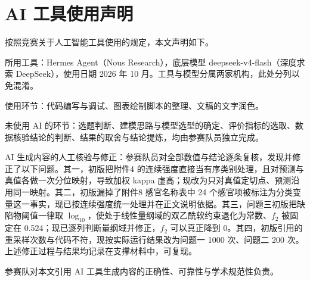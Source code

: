 \section*{AI 工具使用声明}

按照竞赛关于人工智能工具使用的规定，本文声明如下。

所用工具：Hermes Agent（Nous Research），底层模型 deepseek-v4-flash（深度求索 DeepSeek），使用日期 2026 年 10 月\cite{deepseek}。工具与模型分属两家机构，此处分列以免混淆。

使用环节：代码编写与调试、图表绘制脚本的整理、文稿的文字润色。

未使用 AI 的环节：选题判断、建模思路与模型选型的确定、评价指标的选取、数据核验结论的判断、结果的取舍与结论提炼，均由参赛队员独立完成。

AI 生成内容的人工核验与修正：参赛队员对全部数值与结论逐条复核，发现并修正了以下问题。其一，初版把附件4 的连续强度直接当有序类别处理，且对预测与真值各做一次分位映射，导致加权 kappa 虚高；现改为只对真值定切点、预测沿用同一映射。其二，初版漏掉了附件8 感官名称表中 24 个感官项被标注为分类变量这一事实，现已按连续强度统一处理并在正文说明依据。其三，问题三初版把缺陷物阈值一律取 $\log_{10}$，使处于线性量纲域的双乙酰软约束退化为常数、$f_2$ 被固定在 0.524；现已逐列判断量纲域并修正，$f_2$ 可以真正降到 0。其四，初版引用的重采样次数与代码不符，现按实际运行结果改为问题一 1000 次、问题二 200 次。上述修正过程与结果均记录在支撑材料中，可复现。

参赛队对本文引用 AI 工具生成内容的正确性、可靠性与学术规范性负责。
